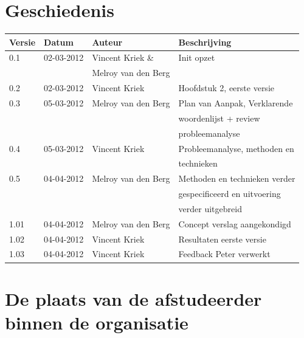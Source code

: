 \documentclass{article}
\begin{document}
\vspace*{\fill}

\section*{Geschiedenis}

\begin{tabular}{|| l | l | l | l ||}\hline
    Versie  &Datum       &Auteur              &Beschrijving                    \\\hline\hline
    0.1     &02-03-2012  &Vincent Kriek \&    &Init opzet                      \\
            &            &Melroy van den Berg &                                \\\hline
    0.2     &02-03-2012  &Vincent Kriek       &Hoofdstuk 2, eerste versie      \\\hline
    0.3     &05-03-2012  &Melroy van den Berg &Plan van Aanpak, Verklarende    \\
            &            &                    &woordenlijst + review           \\
            &            &                    &probleemanalyse                 \\\hline
    0.4     &05-03-2012  &Vincent Kriek       &Probleemanalyse, methoden en    \\
            &            &                    &technieken                      \\\hline
    0.5     &04-04-2012  &Melroy van den Berg &Methoden en technieken verder   \\
            &            &                    &gespecificeerd en uitvoering    \\
            &            &                    &verder uitgebreid               \\\hline
    1.01    &04-04-2012  &Melroy van den Berg &Concept verslag aangekondigd    \\\hline
    1.02    &04-04-2012  &Vincent Kriek       &Resultaten eerste versie        \\\hline
    1.03    &04-04-2012  &Vincent Kriek       &Feedback Peter verwerkt         \\\hline
\end{tabular}

\newpage
\tableofcontents
\listoftables
\listoffigures

\newpage
\section{De plaats van de afstudeerder binnen de organisatie}
\end{document}
